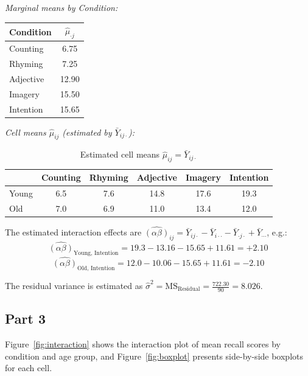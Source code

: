 \documentclass[letterpaper]{article}
\begin{document}
	\vspace{0.5em}
	\noindent\textit{Marginal means by Condition:}
	
	\begin{table}[H]
		\centering
		\begin{tabular}{lc}
			\toprule
			Condition & $\hat{\mu}_{\cdot j}$ \\
			\midrule
			Counting   & 6.75  \\
			Rhyming    & 7.25  \\
			Adjective  & 12.90 \\
			Imagery    & 15.50 \\
			Intention  & 15.65 \\
			\bottomrule
		\end{tabular}
	\end{table}
	
	\noindent\textit{Cell means $\hat{\mu}_{ij}$ (estimated by $\bar{Y}_{ij\cdot}$):}
	
	\begin{table}[H]
		\centering
		\begin{tabular}{lccccc}
			\toprule
			& Counting & Rhyming & Adjective & Imagery & Intention \\
			\midrule
			Young & 6.5  & 7.6  & 14.8 & 17.6 & 19.3 \\
			Old   & 7.0  & 6.9  & 11.0 & 13.4 & 12.0 \\
			\bottomrule
		\end{tabular}
		\caption{Estimated cell means $\hat{\mu}_{ij} = \bar{Y}_{ij\cdot}$}
	\end{table}
	
	The estimated interaction effects are $\widehat{(\alpha\beta)}_{ij} = \bar{Y}_{ij\cdot} - \bar{Y}_{i\cdot\cdot} - \bar{Y}_{\cdot j\cdot} + \bar{Y}_{\cdots}$, e.g.:
	\[
	\widehat{(\alpha\beta)}_{\text{Young, Intention}} = 19.3 - 13.16 - 15.65 + 11.61 = +2.10
	\]
	\[
	\widehat{(\alpha\beta)}_{\text{Old, Intention}} = 12.0 - 10.06 - 15.65 + 11.61 = -2.10
	\]
	
	The residual variance is estimated as $\hat{\sigma}^2 = \text{MS}_{\text{Residual}} = \frac{722.30}{90} = 8.026$.
	
	\subsection{Part 3}
	
	Figure~\ref{fig:interaction} shows the interaction plot of mean recall scores by condition and age group, and Figure~\ref{fig:boxplot} presents side-by-side boxplots for each cell.
	
\end{document}
